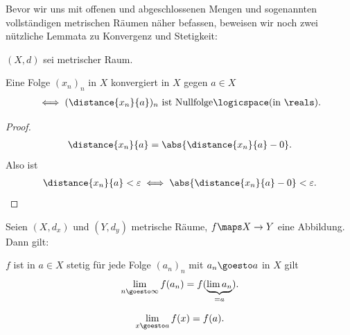 Bevor wir uns mit offenen und abgeschlossenen Mengen und sogenannten vollständigen metrischen Räumen näher befassen, beweisen wir noch zwei nützliche Lemmata zu Konvergenz und Stetigkeit:

\begin{lemma}\label{konvergenz_abstand_ist_nullfolge}
    \( (X,d) \) sei metrischer Raum.

    Eine Folge \( (x_n)_n \) in \( X \) konvergiert in \( X \) gegen \( a\in X \)
    \begin{align*}
        \iff (\distance{x_n}{a})_n \text{ ist Nullfolge}\logicspace(\text{in } \reals).
    \end{align*}
\end{lemma}
\begin{proof}
    \begin{align*}
        \distance{x_n}{a}=\abs{\distance{x_n}{a}-0}.
    \end{align*}
    Also ist
    \begin{align*}
        \distance{x_n}{a}<\varepsilon\iff \abs{\distance{x_n}{a}-0}<\varepsilon.
    \end{align*}
    
\end{proof}
\begin{lemma}\label{stetigkeit:folgenkonvergenzkriterium}
    Seien \( (X,d_x) \) und \( (Y, d_y) \) metrische Räume, \( f\maps X\to Y \) eine Abbildung. 
    Dann gilt:

    \( f \) ist in \( a\in X \) stetig \tiff für jede Folge \( (a_n)_n \) mit \( a_n\goesto a \) in \( X \) gilt
    \begin{align*}
        \lim\limits_{n \goesto \infty}  f(a_n)=f(\underbrace{\lim a_n}_{=a}).
    \end{align*} 
    \begin{notation*}
        \begin{align*}
            \lim\limits_{x \goesto a} f(x)=f(a).
        \end{align*}
    \end{notation*}
    
\end{lemma}

